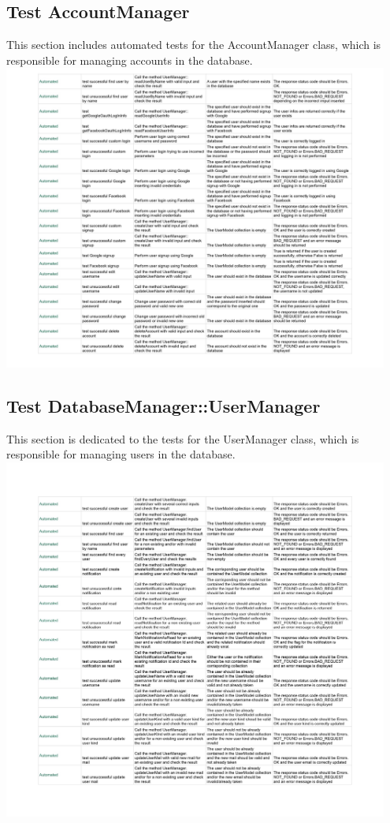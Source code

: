 \documentclass{article}
\begin{document}
\subsection*{Test AccountManager}
This section includes automated tests for the AccountManager class, which is responsible for managing accounts in the database.
\newline
\includegraphics[width=0.95\textwidth]{images/Test_AccountManager.jpg}

\subsection*{Test DatabaseManager::UserManager}
This section is dedicated to the tests for the UserManager class, which is responsible for managing users in the database.
\newline
\includegraphics[width=0.95\textwidth]{images/Test_DatabaseManagerUserManager.jpg}
\end{document}

